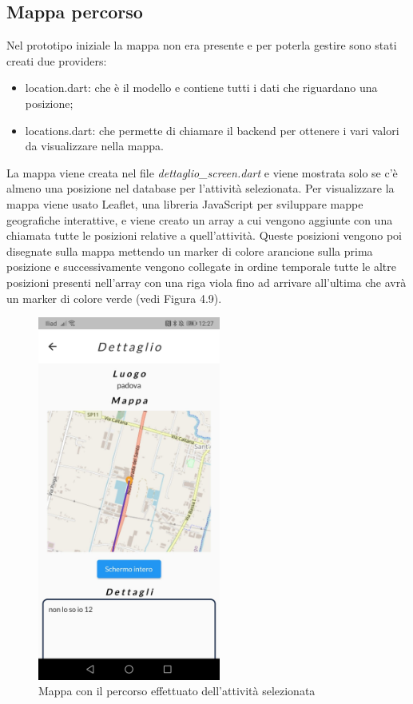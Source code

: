 \subsection{Mappa percorso}
Nel prototipo iniziale la mappa non era presente e per poterla gestire sono stati creati due providers:
\begin{itemize}
	\item location.dart: che è il modello e contiene tutti i dati che riguardano una posizione;
	\item locations.dart: che permette di chiamare il backend per ottenere i vari valori da visualizzare nella mappa.
\end{itemize}
La mappa viene creata nel file \textit{dettaglio\_screen.dart} e viene mostrata solo se c'è almeno una posizione nel database per l'attività selezionata.
Per visualizzare la mappa viene usato Leaflet, una libreria JavaScript per sviluppare mappe geografiche interattive, e viene creato un array a cui vengono aggiunte con una chiamata tutte le posizioni relative a quell'attività.
Queste posizioni vengono poi disegnate sulla mappa mettendo un marker di colore arancione sulla prima posizione e successivamente vengono collegate in ordine temporale tutte le altre posizioni presenti nell'array con una riga viola fino ad arrivare all'ultima che avrà un marker di colore verde (vedi Figura 4.9).\\

\begin{figure}[htbp]	
	\centering
	\includegraphics[width=6cm]{immagini/mappa.jpeg}
	\caption{Mappa con il percorso effettuato dell'attività selezionata}
	\label{fig:Mappa percorso}
\end{figure}

